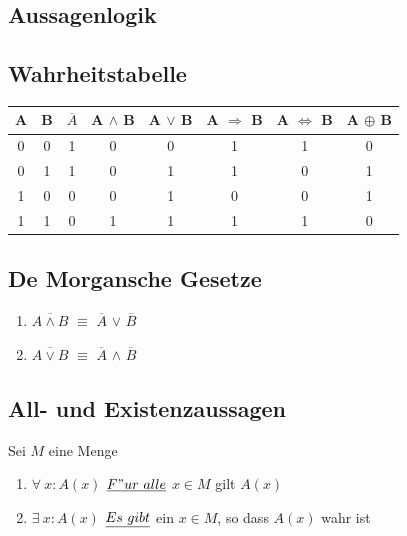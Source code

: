 \documentclass[10pt,a4paper,landscape]{article}
\begin{document}
	\begin{multicols*}{3}
		
		\section{Aussagenlogik} 
		\subsection{Wahrheitstabelle} 
		
		\begin{tabular}{ c | c | c | c | c | c | c | c }
			A & B & $\overline{A}$ & A $\land$ B & A $\lor$  B & A $\Rightarrow$ B & A $\Leftrightarrow$ B & A $\oplus$ B \\\hline
			0 & 0 & 1              & 0           & 0           & 1                 & 1                     & 0            \\
			0 & 1 & 1              & 0           & 1           & 1                 & 0                     & 1            \\
			1 & 0 & 0              & 0           & 1           & 0                 & 0                     & 1            \\
			1 & 1 & 0              & 1           & 1           & 1                 & 1                     & 0            \\
		\end{tabular}
		
		\subsection{De Morgansche Gesetze}
		\begin{enumerate}
			\item $\overline{A \land B}$ $\equiv$ $\overline{A}$ $\lor$ $\overline{B}$ 
			\item $\overline{A \lor B}$ $\equiv$ $\overline{A}$ $\land$ $\overline{B}$
		\end{enumerate}
		
		\subsection{All- und Existenzaussagen}
		Sei $M$ eine Menge
		\begin{enumerate}
			\item $\forall~x : A(x)$ $\uline{F"ur~alle}$ $x \in M$ gilt $A(x)$
			\item $\exists~x : A(x)$ $\uline{Es~gibt}$ ein $x \in M$, so dass $A(x)$ wahr ist
		\end{enumerate}
		

\end{multicols*}
\end{document}
